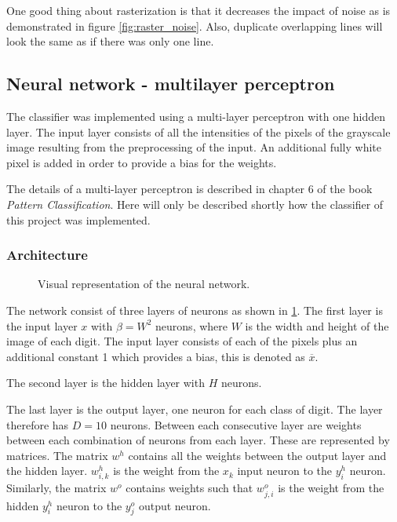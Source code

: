 \documentclass[report.tex]{subfile}
\begin{document}
One good thing about rasterization is that it decreases the impact of noise as
is demonstrated in figure \ref{fig:raster_noise}. Also, duplicate overlapping
lines will look the same as if there was only one line.

\subsection{Neural network - multilayer perceptron}
The classifier was implemented using a multi-layer perceptron with one hidden
layer. The input layer consists of all the intensities of the pixels of the
grayscale image resulting from the preprocessing of the input. An additional
fully white pixel is added in order to provide a bias for the weights.

The details of a multi-layer perceptron is described in chapter 6 of the book
\emph{Pattern Classification}\cite{hart-pattern}. Here will only be described
shortly how the classifier of this project was implemented.

\subsubsection{Architecture}
\begin{figure}[h]
    \centering
    
    \caption{Visual representation of the neural network.}
    \label{fig:mlp}
\end{figure}
The network consist of three layers of neurons as shown in \ref{fig:mlp}.  The
first layer is the input layer $x$ with $\beta=W^2$ neurons, where $W$ is the
width and height of the image of each digit. The input layer consists of each
of the pixels plus an additional constant 1 which provides a bias, this is
denoted as $\overline x$.

The second layer is the hidden layer with $H$ neurons.

The last layer is the output layer, one neuron for each class of digit. The
layer therefore has $D=10$ neurons. Between each consecutive layer are weights
between each combination of neurons from each layer. These are represented by
matrices. The matrix $w^h$ contains all the weights between the output layer
and the hidden layer. $w^h_{i,k}$ is the weight from the $x_k$ input neuron to
the $y^h_i$ neuron. Similarly, the matrix $w^o$ contains weights such that
$w^o_{j,i}$ is the weight from the hidden $y^h_i$ neuron to the $y^o_j$ output
neuron.

\end{document}
